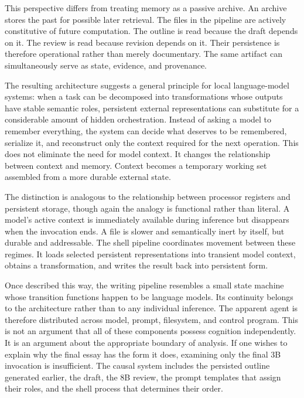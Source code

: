 \documentclass[11pt]{article}
\begin{document}
This perspective differs from treating memory as a passive archive. An archive stores the past for possible later retrieval. The files in the pipeline are actively constitutive of future computation. The outline is read because the draft depends on it. The review is read because revision depends on it. Their persistence is therefore operational rather than merely documentary. The same artifact can simultaneously serve as state, evidence, and provenance.

The resulting architecture suggests a general principle for local language-model systems: when a task can be decomposed into transformations whose outputs have stable semantic roles, persistent external representations can substitute for a considerable amount of hidden orchestration. Instead of asking a model to remember everything, the system can decide what deserves to be remembered, serialize it, and reconstruct only the context required for the next operation. This does not eliminate the need for model context. It changes the relationship between context and memory. Context becomes a temporary working set assembled from a more durable external state.

The distinction is analogous to the relationship between processor registers and persistent storage, though again the analogy is functional rather than literal. A model's active context is immediately available during inference but disappears when the invocation ends. A file is slower and semantically inert by itself, but durable and addressable. The shell pipeline coordinates movement between these regimes. It loads selected persistent representations into transient model context, obtains a transformation, and writes the result back into persistent form.

Once described this way, the writing pipeline resembles a small state machine whose transition functions happen to be language models. Its continuity belongs to the architecture rather than to any individual inference. The apparent agent is therefore distributed across model, prompt, filesystem, and control program. This is not an argument that all of these components possess cognition independently. It is an argument about the appropriate boundary of analysis. If one wishes to explain why the final essay has the form it does, examining only the final 3B invocation is insufficient. The causal system includes the persisted outline generated earlier, the draft, the 8B review, the prompt templates that assign their roles, and the shell process that determines their order.
\end{document}
